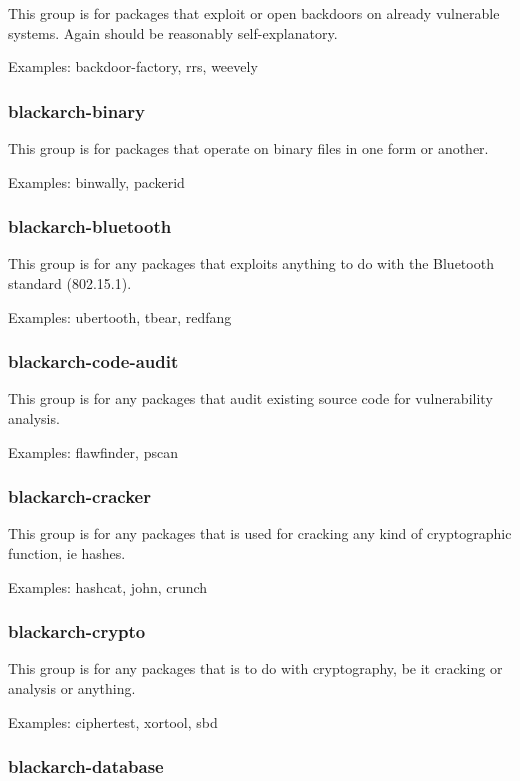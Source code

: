 \documentclass[a4paper, oneside, 11pt]{book}
\begin{document}
This group is for packages that exploit or open backdoors on already vulnerable systems. Again should be reasonably self-explanatory.

Examples: backdoor-factory, rrs, weevely

\subsubsection{blackarch-binary}

This group is for packages that operate on binary files in one form or another.

Examples: binwally, packerid

\subsubsection{blackarch-bluetooth}

This group is for any packages that exploits anything to do with the Bluetooth standard (802.15.1).

Examples: ubertooth, tbear, redfang

\subsubsection{blackarch-code-audit}

This group is for any packages that audit existing source code for vulnerability analysis.

Examples: flawfinder, pscan

\subsubsection{blackarch-cracker}

This group is for any packages that is used for cracking any kind of cryptographic function, ie hashes.

Examples: hashcat, john, crunch

\subsubsection{blackarch-crypto}

This group is for any packages that is to do with cryptography, be it cracking or analysis or anything.

Examples: ciphertest, xortool, sbd

\subsubsection{blackarch-database}
\end{document}
